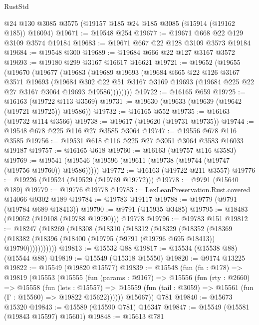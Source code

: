 \begin{lexlean}{RustStd}
\begin{coremodule}
    @24
    @130
    @3085
    @3575
    (@19157 @185 @24 @185 @3085 (@15914 (@19162 @185)) @16094)
@19671 := @19548 @254
@19677 := @19671 @668 @22 @129 @3109 @3574 @19184
@19683 := @19671 @667 @22 @128 @3109 @3573 @19184
@19684 := @19548 @300
@19689 := @19684 @666 @22 @127 @3167 @3572
@19693 := @19180 @299 @3167 @16617 @16621
@19721 := @19652
    (@19655
      (@19670
        (@19677
          (@19683
            (@19689
              @19693
              (@19684
                @665
                @22
                @126
                @3167
                @3571
                @19693
                (@19684
                  @302
                  @22
                  @51
                  @3167
                  @3169
                  @19693
                  (@19684 @225 @22 @27 @3167 @3064 @19693 @19586))))))))
@19722 := @16165 @659
@19725 := @16163 (@19722 @113 @3569)
@19731 := @19630 (@19633 (@19639 (@19642 (@19721 @19725)) @19586))
@19732 := @16165 @552
@19735 := @16163 (@19732 @114 @3566)
@19738 := @19617 (@19620 (@19731 @19735))
@19744 := @19548 @678 @225 @116 @27 @3585 @3064
@19747 := @19556 @678 @116 @3585
@19756 := @19531 @618 @116 @225 @27 @3051 @3064 @3583 @16033 @19187
@19757 := @16165 @618
@19760 := @16163 (@19757 @116 @3583)
@19769 := @19541 (@19546 (@19596 (@19611 (@19738 (@19744 (@19747 (@19756 @19760)) @19586)))))
@19772 := @16163 (@19722 @211 @3557)
@19776 := @19226 (@19524 (@19529 (@19769 @19772)))
@19778 := @9791 (@15640 @189)
@19779 := @19776 @19778
@19783 := LexLeanPreservation.Rust.covered @14066 @9302 @189
@19784 := @19783 @19117
@19788 := @19779 (@9791 (@19784 @689 @18413))
@19790 := @9791 (@15935 @3485)
@19795 := @18483 (@19052 (@19108 (@19788 @19790))) @19778
@19796 := @19783 @151
@19812 := @18247
    (@18269
      (@18308
        (@18310
          (@18312
            (@18329
              (@18352
                (@18369
                  (@18382 (@18396 (@18400 (@19795 (@9791 (@19796 @695 @18413)) @19790)))))))))))
@19813 := @15532 @88
@19817 := @15534 (@15538 @88) (@15544 @88)
@19819 := @15549 (@15318 @15550)
@19820 := @9174 @13225
@19822 := @15549 (@19820 @15577)
@19839 := @15548
    (fun (fn : @178) =>
    @19819
      (@15553
        (@15555
          (fun (params : @9167) =>
          @15556
            (fun (rty : @2660) =>
            @15558
              (fun (lets : @15557) =>
              @15559 (fun (tail : @3059) => @15561 (fun (Γ : @15560) => @19822 @15622))))))
        @15667))
    @781
@19840 := @15673 @15320
@19843 := @15589 (@15590 @781) @16347
@19847 := @15549 (@15581 (@19843 @15597) @15601)
@19848 := @15613 @781

\end{coremodule}
\end{lexlean}
